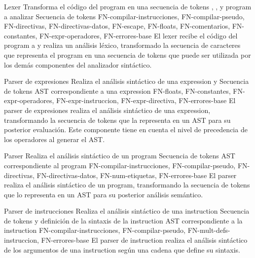 \begin{component}{Lexer}
    {Transforma el código del \gls{program} en una secuencia de \glspl{token}} %
    {, , y } %
    {\Gls{program} a analizar} %
    {Secuencia de \glspl{token}} %
    {FN-compilar-instrucciones, FN-compilar-pseudo, FN-directivas,
    FN-directivas-datos, FN-escape, FN-floats, FN-comentarios,
    FN-constantes, FN-expr-operadores, FN-errores-base} %
    El lexer recibe el código del \gls{program} a
     y realiza un análisis léxico, transformado
    la secuencia de caracteres que representa el \gls{program} en una secuencia
    de \glspl{token} que puede ser utilizada por los demás componentes del
    analizador sintáctico.
\end{component}

\begin{component}{Parser de expresiones}
    {Realiza el análisis sintáctico de una \gls{expression}} %
    { y } %
    {Secuencia de \glspl{token}} %
    {\gls{AST} correspondiente a una \gls{expression}} %
    {FN-floats, FN-constantes, FN-expr-operadores,
    FN-expr-instruccion, FN-expr-directiva, FN-errores-base} %
    El \gls{parser} de expresiones realiza el análisis sintáctico de una
    \gls{expression}, transformando la secuencia de \glspl{token} que la
    representa en un \gls{AST} para su posterior evaluación. Este componente
    tiene en cuenta el nivel de precedencia de los operadores al generar el
    \gls{AST}.
\end{component}

\begin{component}{Parser}
    {Realiza el análisis sintáctico de un \gls{program}} %
    {} %
    {Secuencia de \glspl{token}} %
    {\gls{AST} correspondiente al \gls{program}} %
    {FN-compilar-instrucciones, FN-compilar-pseudo, FN-directivas,
    FN-directivas-datos, FN-num-etiquetas, FN-errores-base} %
    El \gls{parser} realiza el análisis sintáctico de un \gls{program},
    transformando la secuencia de \glspl{token} que lo representa en un
    \gls{AST} para su posterior análisis semántico.
\end{component}

\begin{component}{Parser de instrucciones}
    {Realiza el análisis sintáctico de una \gls{instruction}} %
    {} %
    {Secuencia de \glspl{token} y definición de la sintaxis de la \gls{instruction}} %
    {\gls{AST} correspondiente a la \gls{instruction}} %
    {FN-compilar-instrucciones, FN-compilar-pseudo,
    FN-mult-defs-instruccion, FN-errores-base} %
    El \gls{parser} de \gls{instruction} realiza el análisis sintáctico de los
    argumentos de una \gls{instruction} según una cadena que define su sintaxis.
\end{component}

